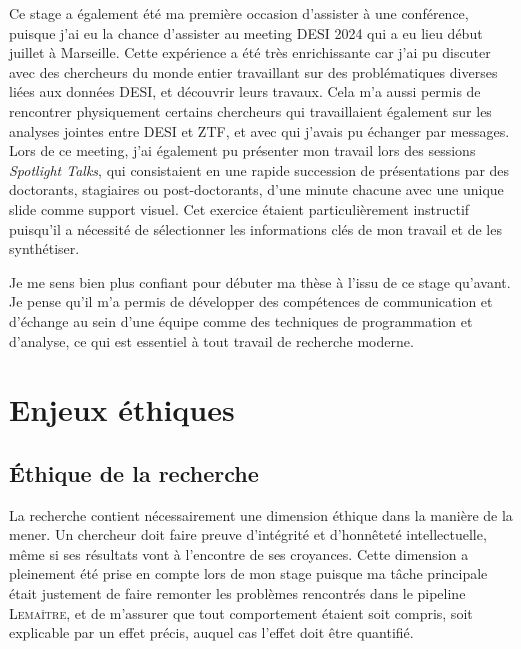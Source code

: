 \documentclass{book}
\def\lemaitre{\textsc{Lemaître}\xspace}
\begin{document}
Ce stage a également été ma première occasion d'assister à une conférence, puisque j'ai eu la chance d'assister au meeting DESI 2024 qui a eu lieu début juillet à Marseille. Cette expérience a été très enrichissante car j'ai pu discuter avec des chercheurs du monde entier travaillant sur des problématiques diverses liées aux données DESI, et découvrir leurs travaux. Cela m'a aussi permis de rencontrer physiquement certains chercheurs qui travaillaient également sur les analyses jointes entre DESI et ZTF, et avec qui j'avais pu échanger par messages. Lors de ce meeting, j'ai également pu présenter mon travail lors des sessions \textit{Spotlight Talks}, qui consistaient en une rapide succession de présentations par des doctorants, stagiaires ou post-doctorants, d'une minute chacune avec une unique slide comme support visuel. Cet exercice étaient particulièrement instructif puisqu'il a nécessité de sélectionner les informations clés de mon travail et de les synthétiser.

Je me sens bien plus confiant pour débuter ma thèse à l'issu de ce stage qu'avant. Je pense qu'il m'a permis de développer des compétences de communication et d'échange au sein d'une équipe comme des techniques de programmation et d'analyse, ce qui est essentiel à tout travail de recherche moderne.


\chapter{Enjeux éthiques}

\section{Éthique de la recherche}

La recherche contient nécessairement une dimension éthique dans la manière de la mener. Un chercheur doit faire preuve d'intégrité et d'honnêteté intellectuelle, même si ses résultats vont à l'encontre de ses croyances. Cette dimension a pleinement été prise en compte lors de mon stage puisque ma tâche principale était justement de faire remonter les problèmes rencontrés dans le pipeline \lemaitre, et de m'assurer que tout comportement étaient soit compris, soit explicable par un effet précis, auquel cas l'effet doit être quantifié.
\end{document}
